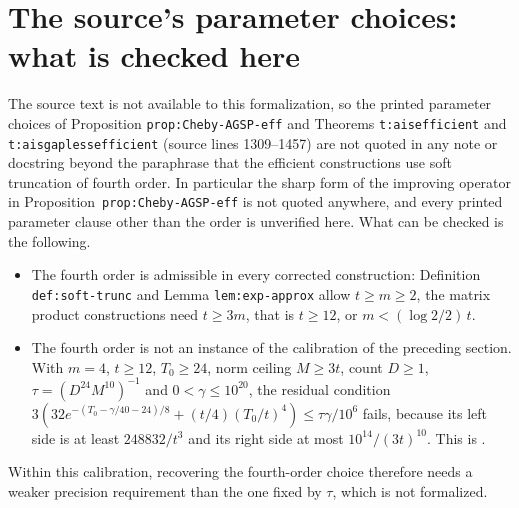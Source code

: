 \documentclass{article}
\begin{document}
\section{The source's parameter choices: what is checked here}
The source text is not available to this formalization, so the printed
parameter choices of Proposition \texttt{prop:Cheby-AGSP-eff} and Theorems
\texttt{t:aisefficient} and \texttt{t:aisgaplessefficient} (source lines
1309--1457) are not quoted in any note or docstring beyond the paraphrase
that the efficient constructions use soft truncation of fourth order. In
particular the sharp form of the improving operator in
Proposition~\texttt{prop:Cheby-AGSP-eff} is not quoted anywhere, and every
printed parameter clause other than the order is unverified here.
What can be checked is the following.
\begin{itemize}
 \item The fourth order is admissible in every corrected construction:
  Definition \texttt{def:soft-trunc} and Lemma \texttt{lem:exp-approx}
  allow $t\geq m\geq2$, the matrix product constructions need $t\geq3m$,
  that is $t\geq12$, or $m<(\log2/2)\,t$.
 \item The fourth order is not an instance of the calibration of the
  preceding section. With $m=4$, $t\geq12$, $T_0\geq24$, norm ceiling
  $M\geq3t$, count $D\geq1$, $\tau=(D^{24}M^{10})^{-1}$ and
  $0<\gamma\leq10^{20}$, the residual condition
  $3(32e^{-(T_0-\gamma/40-24)/8}+(t/4)(T_0/t)^4)\leq\tau\gamma/10^6$ fails,
  because its left side is at least $248832/t^3$ and its right side at most
  $10^{14}/(3t)^{10}$. This is
  .
\end{itemize}
Within this calibration, recovering the fourth-order choice therefore needs
a weaker precision requirement than the one fixed by $\tau$, which is not
formalized.
\end{document}
